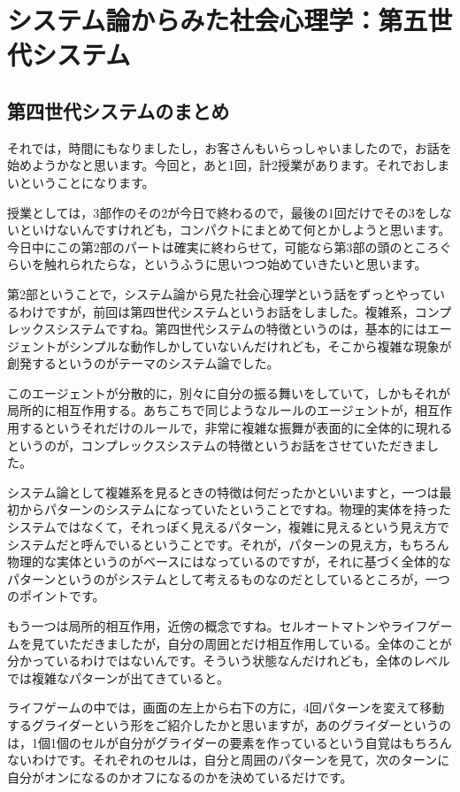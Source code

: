 \documentclass{ltjsbook}
\begin{document}
\setcounter{chapter}{10}
\chapter{システム論からみた社会心理学：第五世代システム}
\label{sp11_system}

\section{第四世代システムのまとめ}
それでは，時間にもなりましたし，お客さんもいらっしゃいましたので，お話を始めようかなと思います。今回と，あと1回，計2授業があります。それでおしまいということになります。

授業としては，3部作のその2が今日で終わるので，最後の1回だけでその3をしないといけないんですけれども，コンパクトにまとめて何とかしようと思います。今日中にこの第2部のパートは確実に終わらせて，可能なら第3部の頭のところぐらいを触れられたらな，というふうに思いつつ始めていきたいと思います。

第2部ということで，システム論から見た社会心理学という話をずっとやっているわけですが，前回は第四世代システムというお話をしました。複雑系，コンプレックスシステムですね。第四世代システムの特徴というのは，基本的にはエージェントがシンプルな動作しかしていないんだけれども，そこから複雑な現象が創発するというのがテーマのシステム論でした。

このエージェントが分散的に，別々に自分の振る舞いをしていて，しかもそれが局所的に相互作用する。あちこちで同じようなルールのエージェントが，相互作用するというそれだけのルールで，非常に複雑な振舞が表面的に全体的に現れるというのが，コンプレックスシステムの特徴というお話をさせていただきました。

システム論として複雑系を見るときの特徴は何だったかといいますと，一つは最初からパターンのシステムになっていたということですね。物理的実体を持ったシステムではなくて，それっぽく見えるパターン，複雑に見えるという見え方でシステムだと呼んでいるということです。それが，パターンの見え方，もちろん物理的な実体というのがベースにはなっているのですが，それに基づく全体的なパターンというのがシステムとして考えるものなのだとしているところが，一つのポイントです。

もう一つは局所的相互作用，近傍の概念ですね。セルオートマトンやライフゲームを見ていただきましたが，自分の周囲とだけ相互作用している。全体のことが分かっているわけではないんです。そういう状態なんだけれども，全体のレベルでは複雑なパターンが出てきていると。

ライフゲームの中では，画面の左上から右下の方に，4回パターンを変えて移動するグライダーという形をご紹介したかと思いますが，あのグライダーというのは，1個1個のセルが自分がグライダーの要素を作っているという自覚はもちろんないわけです。それぞれのセルは，自分と周囲のパターンを見て，次のターンに自分がオンになるのかオフになるのかを決めているだけです。
\end{document}
